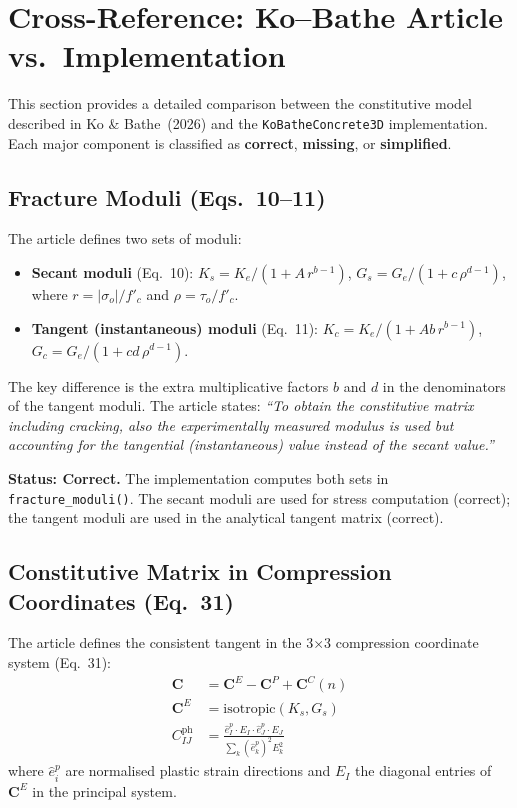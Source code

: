 \section{Cross-Reference: Ko--Bathe Article vs.\ Implementation}
\label{sec:article-crossref}

This section provides a detailed comparison between the constitutive
model described in Ko \& Bathe~(2026) and the
\texttt{KoBatheConcrete3D} implementation.  Each major component is
classified as \textbf{correct}, \textbf{missing}, or
\textbf{simplified}.

\subsection{Fracture Moduli (Eqs.~10--11)}

The article defines two sets of moduli:
\begin{itemize}
  \item \textbf{Secant moduli} (Eq.~10):
    $K_s = K_e / (1 + A\, r^{b-1})$, \;
    $G_s = G_e / (1 + c\, \rho^{d-1})$,
    where $r = |\sigma_o| / f'_c$ and $\rho = \tau_o / f'_c$.
  \item \textbf{Tangent (instantaneous) moduli} (Eq.~11):
    $K_c = K_e / (1 + Ab\, r^{b-1})$, \;
    $G_c = G_e / (1 + cd\, \rho^{d-1})$.
\end{itemize}

The key difference is the extra multiplicative factors $b$ and $d$ in
the denominators of the tangent moduli.  The article states:
\emph{``To obtain the constitutive matrix including cracking, also the
experimentally measured modulus is used but accounting for the
tangential (instantaneous) value instead of the secant value.''}

\textbf{Status: Correct.}  The implementation computes both sets in
\texttt{fracture\_moduli()}.  The secant moduli are used for stress
computation (correct); the tangent moduli are used in the analytical
tangent matrix (correct).

\subsection{Constitutive Matrix in Compression Coordinates (Eq.~31)}

The article defines the consistent tangent in the 3$\times$3
compression coordinate system (Eq.~31):
\begin{align}
  \mathbf{C} &= \mathbf{C}^E - \mathbf{C}^P + \mathbf{C}^C(n)
  \label{eq:tangent-decomposition} \\
  \mathbf{C}^E &= \text{isotropic}(K_s, G_s)
  \label{eq:elastic-tangent} \\
  C^{\text{ph}}_{IJ} &= \frac{\hat{e}^p_I \cdot E_I \cdot
    \hat{e}^p_J \cdot E_J}
    {\sum_k (\hat{e}^p_k)^2 E_k^2}
  \label{eq:plastic-tangent}
\end{align}
where $\hat{e}^p_i$ are normalised plastic strain directions and $E_I$
the diagonal entries of $\mathbf{C}^E$ in the principal system.

